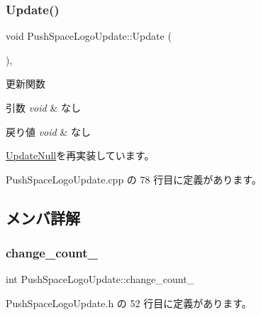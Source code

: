 \subsubsection{\texorpdfstring{Update()}{Update()}}
{\footnotesize\ttfamily void Push\+Space\+Logo\+Update\+::\+Update (\begin{DoxyParamCaption}{ }\end{DoxyParamCaption})\hspace{0.3cm}{\ttfamily [override]}, {\ttfamily [virtual]}}



更新関数 


\begin{DoxyParams}{引数}
{\em void} & なし \\
\hline
\end{DoxyParams}

\begin{DoxyRetVals}{戻り値}
{\em void} & なし \\
\hline
\end{DoxyRetVals}


\mbox{\hyperlink{class_update_null_a692f4f34e4ef35ca286a1d3606fdf473}{Update\+Null}}を再実装しています。



 Push\+Space\+Logo\+Update.\+cpp の 78 行目に定義があります。



\subsection{メンバ詳解}
\mbox{\label{class_push_space_logo_update_abb01ae1dcc8858389d98f95509b6dff7}} 
\subsubsection{\texorpdfstring{change\+\_\+count\+\_\+}{change\_count\_}}
{\footnotesize\ttfamily int Push\+Space\+Logo\+Update\+::change\+\_\+count\+\_\+\hspace{0.3cm}{\ttfamily [private]}}



 Push\+Space\+Logo\+Update.\+h の 52 行目に定義があります。

\mbox{\label{class_push_space_logo_update_a19a827951aba3490bd1fa2d78252838a}} 
